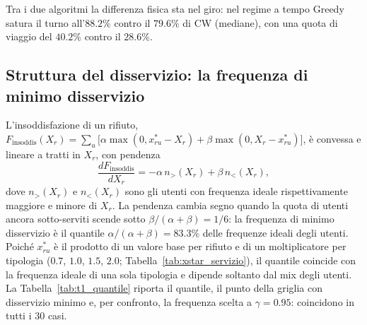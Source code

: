 Tra i due algoritmi la differenza fisica sta nel giro: nel regime a tempo Greedy satura il turno all'$88.2\%$ contro il $79.6\%$ di CW (mediane), con una quota di viaggio del $40.2\%$ contro il $28.6\%$.

\subsection{Struttura del disservizio: la frequenza di minimo disservizio}\label{sse:t1-quantile}

L'insoddisfazione di un rifiuto, $F_{\mathrm{insoddis}}(X_r)=\sum_u\bigl[\alpha\max(0,x^*_{ru}-X_r)+\beta\max(0,X_r-x^*_{ru})\bigr]$, è convessa e lineare a tratti in $X_r$, con pendenza
\begin{equation}\label{eq:t1_pendenza}
	\frac{dF_{\mathrm{insoddis}}}{dX_r}=-\alpha\,n_>(X_r)+\beta\,n_<(X_r),
\end{equation}
dove $n_>(X_r)$ e $n_<(X_r)$ sono gli utenti con frequenza ideale rispettivamente maggiore e minore di $X_r$. La pendenza cambia segno quando la quota di utenti ancora sotto-serviti scende sotto $\beta/(\alpha+\beta)=1/6$: la frequenza di minimo disservizio è il quantile $\alpha/(\alpha+\beta)=83.3\%$ delle frequenze ideali degli utenti. Poiché $x^*_{ru}$ è il prodotto di un valore base per rifiuto e di un moltiplicatore per tipologia ($0.7$, $1.0$, $1.5$, $2.0$; Tabella~\ref{tab:xstar_servizio}), il quantile coincide con la frequenza ideale di una sola tipologia e dipende soltanto dal mix degli utenti. La Tabella~\ref{tab:t1_quantile} riporta il quantile, il punto della griglia con disservizio minimo e, per confronto, la frequenza scelta a $\gamma=0.95$: coincidono in tutti i $30$ casi.

